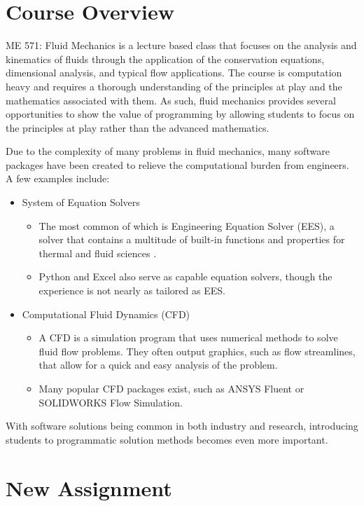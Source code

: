 \section{Course Overview}

ME 571: Fluid Mechanics is a lecture based class that focuses on the analysis
and kinematics of fluids through the application of the conservation equations, dimensional
analysis, and typical flow applications. The course is computation heavy and requires
a thorough understanding of the principles at play and the mathematics associated with them.
As such, fluid mechanics provides several opportunities to show the value of programming by
allowing students to focus on the principles at play rather than the advanced mathematics.

Due to the complexity of many problems in fluid mechanics, many software packages have been
created to relieve the computational burden from engineers. A few examples include:

\begin{itemize}
    \item System of Equation Solvers
    \begin{itemize}
        \item The most common of which is Engineering Equation Solver (EES), a 
        solver that contains a multitude of built-in functions 
        and properties for thermal and fluid sciences \cite{ees}.
        \item Python and Excel also serve as capable equation solvers, though
        the experience is not nearly as tailored as EES.
    \end{itemize}
    \item Computational Fluid Dynamics (CFD)
    \begin{itemize}
        \item A CFD is a simulation program that uses numerical methods to solve fluid flow
        problems. They often output graphics, such as flow streamlines, that allow for
        a quick and easy analysis of the problem.
        \item Many popular CFD packages exist, such as ANSYS Fluent or SOLIDWORKS Flow Simulation.
    \end{itemize}
\end{itemize}

With software solutions being common in both industry and research, introducing students to
programmatic solution methods becomes even more important.

\section{New Assignment}

